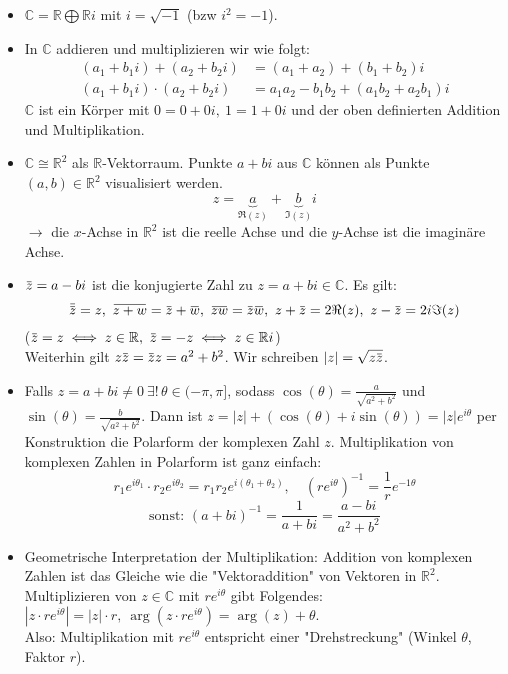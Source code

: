 \documentclass[a4paper,12pt]{book}
\theoremstyle{newthm}
\theoremstyle{newdef}
\theoremstyle{newrem}
\newcommand{\R}{\mathbb{R}}
\newcommand{\C}{\mathbb{C}}
\newcommand{\overbar}[1]{\mkern 1.5mu\overline{\mkern-1.5mu#1\mkern-1.5mu}\mkern 1.5mu}
\begin{document}
		\begin{itemize}
			\item $ \C = \R \bigoplus \R i $ mit $ i = \sqrt{-1} $ (bzw $ i^2 = -1 $). 
			
			\item In $\C$ addieren und multiplizieren wir wie folgt:
			\begin{align*}
			(a_1 + b_1i) + (a_2 + b_2i) &= (a_1 + a_2) + (b_1 + b_2)i\\
			(a_1 + b_1i) \cdot (a_2 + b_2i) &= a_1a_2 - b_1b_2 + (a_1b_2 + a_2b_1)i
			\end{align*}
			$\C$ ist ein Körper mit $ 0 = 0+0i,\ 1 = 1+0i $ und der oben definierten Addition und Multiplikation.
			
			\item $ \C \cong \R^2 $ als $\R$-Vektorraum. Punkte $ a+bi $ aus $\C$ können als Punkte $ (a,b) \in \R^2 $ visualisiert werden.
			\[ z= \underbrace{a}_{\Re(z)} + \underbrace{b}_{\Im(z)}i \]
			$ \rightarrow $ die $x$-Achse in $\R^2$ ist die reelle Achse und die $y$-Achse ist die imaginäre Achse.
			
			\item $ \overbar{z} = a-bi $ ist die konjugierte Zahl zu $ z = a+bi \in \C $. Es gilt:
			\[ \overbar{\overbar{z}} = z,\ \overbar{z+w} = \overbar{z} + \overbar{w},\ \overbar{zw} = \overbar{z} \overbar{w},\ z + \overbar{z} = 2\Re(z),\ z - \overbar{z} = 2i\Im(z) \]
			($ \overbar{z} = z \iff z \in \R,\ \overbar{z} = -z \iff z \in \R i $)\\
			Weiterhin gilt $ z \overbar{z} = \overbar{z} z = a^2 + b^2 $. Wir schreiben $ |z| = \sqrt{z \overbar{z}} $.
			
			\item Falls $ z = a+bi \neq 0\ \exists!\, \theta \in (-\pi,\pi] $, sodass $ \cos(\theta) = \frac{a}{\sqrt{a^2+b^2}} $ und $ \sin(\theta) = \frac{b}{\sqrt{a^2+b^2}}. $ Dann ist $ z = |z| + (\cos(\theta) + i\sin(\theta)) = |z| e^{i \theta} $ per Konstruktion die Polarform der komplexen Zahl $z$. Multiplikation von komplexen Zahlen in Polarform ist ganz einfach:
			\[ r_1 e^{i\theta_1} \cdot r_2 e^{i\theta_2} = r_1r_2 e^{i(\theta_1 + \theta_2)},\quad \left( re^{i\theta} \right)^{-1} = \frac{1}{r} e^{-1\theta} \]
			\[ \text{sonst: } (a+bi)^{-1} = \frac{1}{a+bi} = \frac{a-bi}{a^2+b^2} \]
			
			\item Geometrische Interpretation der Multiplikation: Addition von komplexen Zahlen ist das Gleiche wie die "Vektoraddition" von Vektoren in $\R^2$. Multiplizieren von $ z \in \C $ mit $ re^{i\theta} $ gibt Folgendes: $ |z \cdot re^{i\theta}| = |z| \cdot r,\ \arg(z \cdot re^{i\theta}) = \arg(z) + \theta $.\\
			Also: Multiplikation mit $ re^{i\theta} $ entspricht einer "Drehstreckung" (Winkel $\theta$, Faktor $r$).
			

\end{itemize}
\end{document}
